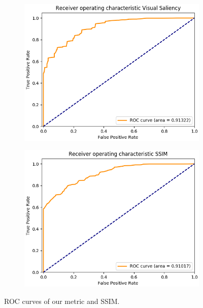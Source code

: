 \documentclass{article}
\begin{document}
\begin{figure}
\centering
\begin{subfigure}{4.3cm}
  \centering
  \includegraphics[width=0.99\linewidth]{figures/roc_ss}
  \caption{}
\end{subfigure}%
\begin{subfigure}{4.3cm}
  \centering
  \includegraphics[width=0.99\linewidth]{figures/roc_ssim}
  \caption{}
\end{subfigure}
\caption{ROC curves of our metric and SSIM.\label{fig:rocs}}
\end{figure}
\end{document}
